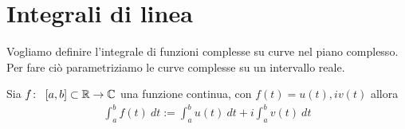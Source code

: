 \chapter{Integrali di linea}

Vogliamo definire l'integrale di funzioni complesse su curve nel piano complesso. Per fare ciò parametriziamo le curve complesse su un intervallo reale. 

\begin{definition}
	\label{defn:integrale-funzione-complessa-parametrizzata-su-intervallo-reale}
	Sia $f \colon\ \left[a,b\right]\subset \mathbb{R} \rightarrow \mathbb{C}$ una funzione continua, con $f(t) = u(t), iv(t)$ allora 
	\begin{equation*}
	\begin{aligned}
	\int_{a}^{b} f(t)\ dt := \int_{a}^{b} u(t)\ dt + i \int_{a}^{b} v(t)\ dt 
	\end{aligned}
	\end{equation*}
\end{definition}

